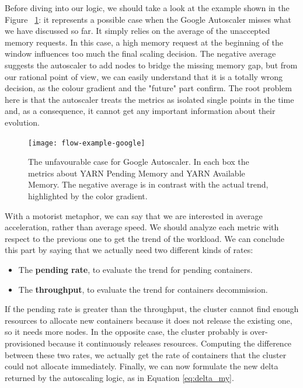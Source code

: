 \documentclass[12pt,twoside,cucitura]{toptesi}
\begin{document}
Before diving into our logic, we should take a look at the example shown in the Figure ~\ref{fig:flow-example-google}: it represents a possible case when the Google Autoscaler misses what we have discussed so far. It simply relies on the average of the unaccepted memory requests. In this case, a high memory request at the beginning of the window influences too much the final scaling decision. The negative average suggests the autoscaler to add nodes to bridge the missing memory gap, but from our rational point of view, we can easily understand that it is a totally wrong decision, as the colour gradient and the "future" part confirm. The root problem here is that the autoscaler treats the metrics as isolated single points in the time and, as a consequence, it cannot get any important information about their evolution.
  
\begin{figure}
\centering
\texttt{[image: flow-example-google]}
\caption{The unfavourable case for Google Autoscaler. In each box the metrics about YARN Pending Memory and YARN Available Memory. The negative average is in contrast with the actual trend, highlighted by the color gradient.}\label{fig:flow-example-google}
\end{figure}

With a motorist metaphor, we can say that we are interested in average acceleration, rather than average speed. We should analyze each metric with respect to the previous one to get the trend of the workload. We can conclude this part by saying that we actually need two different kinds of rates:
\begin{itemize}
	\item The \textbf{pending rate}, to evaluate the trend for pending containers.
	\item The \textbf{throughput}, to evaluate the trend for containers decommission.
\end{itemize}

If the pending rate is greater than the throughput, the cluster cannot find enough resources to allocate new containers because it does not release the existing one, so it needs more nodes. In the opposite case, the cluster probably is over-provisioned because it continuously releases resources. Computing the difference between these two rates, we actually get the rate of containers that the cluster could not allocate immediately. Finally, we can now formulate the new delta returned by the autoscaling logic, as in Equation \ref{eq:delta_my}.
\end{document}
